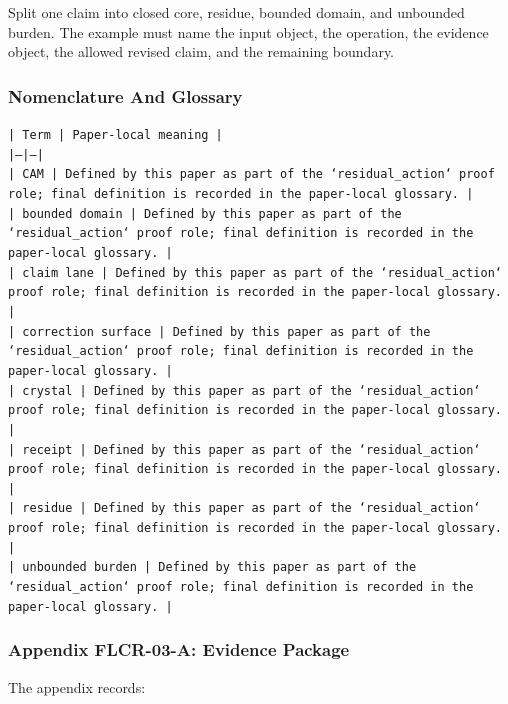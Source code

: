 \documentclass[11pt]{article}
\begin{document}
Split one claim into closed core, residue, bounded domain, and unbounded burden. The example must name the input object, the operation,
the evidence object, the allowed revised claim, and the remaining boundary.

\subsubsection*{Nomenclature And Glossary}

\noindent\texttt{| Term | Paper-local meaning |}\\
\noindent\texttt{|---|---|}\\
\noindent\texttt{| CAM | Defined by this paper as part of the `residual\_action` proof role; final definition is recorded in the paper-local glossary. |}\\
\noindent\texttt{| bounded domain | Defined by this paper as part of the `residual\_action` proof role; final definition is recorded in the paper-local glossary. |}\\
\noindent\texttt{| claim lane | Defined by this paper as part of the `residual\_action` proof role; final definition is recorded in the paper-local glossary. |}\\
\noindent\texttt{| correction surface | Defined by this paper as part of the `residual\_action` proof role; final definition is recorded in the paper-local glossary. |}\\
\noindent\texttt{| crystal | Defined by this paper as part of the `residual\_action` proof role; final definition is recorded in the paper-local glossary. |}\\
\noindent\texttt{| receipt | Defined by this paper as part of the `residual\_action` proof role; final definition is recorded in the paper-local glossary. |}\\
\noindent\texttt{| residue | Defined by this paper as part of the `residual\_action` proof role; final definition is recorded in the paper-local glossary. |}\\
\noindent\texttt{| unbounded burden | Defined by this paper as part of the `residual\_action` proof role; final definition is recorded in the paper-local glossary. |}\\

\subsubsection*{Appendix FLCR-03-A: Evidence Package}

The appendix records:
\end{document}
